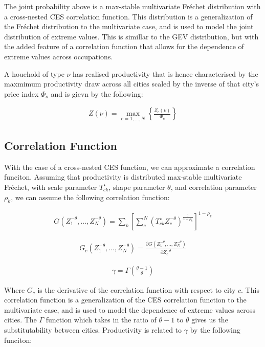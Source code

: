 \documentclass[10pt]{article}
\begin{document}
The joint probability above is a max-stable multivariate Fréchet distribution with a cross-nested CES correlation function. This distribution is a generalization of the Fréchet distribution to the multivariate case, and is used to model the joint distribution of extreme values. This is simillar to the GEV distribution, but with the added feature of a correlation function that allows for the dependence of extreme values across occupations.

A houehold of type $\nu$ has realised productivity that is hence characterised by the maxmimum productivity draw across all cities scaled by the inverse of that city's price index $\Phi_o$ and is gievn by the following:

\begin{align}
    Z(\nu) = \max_{c = 1, \dots, N} \left\{\frac{Z_c(\nu)}{\Phi_c}\right\}
\end{align}

\subsection{Correlation Function}

With the case of a cross-nested CES function, we can approximate a correlation funciton. Assuming that productivity is distributed max-stable multivariate Fréchet, with scale parameter $T_{ck}^{\star}$, shape parameter $\theta$, and correlation parameter $\rho_k$, we can assume the following correlation function:

\begin{align}
    G (Z_1^{-\theta}, \dots, Z_N^{-\theta})= \sum_{k}^{} [\sum_{c}^{N} (T_{ck}^{\star} Z_c^{-\theta})^{\frac{1}{1 - \rho_k}}]^{1 - \rho_k}
\end{align}

\begin{align}
    G_c (Z_1^{-\theta}, \dots, Z_N^{-\theta}) = \frac{\partial G (Z_1^{-\theta}, \dots, Z_N^{-\theta})}{\partial Z_c^{-\theta}}
\end{align}

\begin{align}
    \gamma = \Gamma (\frac{\theta - 1}{\theta})
\end{align}

Where $G_c$ is the derivative of the correlation function with respect to city $c$. This correlation function is a generalization of the CES correlation function to the multivariate case, and is used to model the dependence of extreme values across cities. The $\Gamma$ function which takes in the ratio of $\theta - 1$ to $\theta$ gives us the substitutability between cities. Productivity is related to $\gamma$ by the following funciton:
\end{document}
